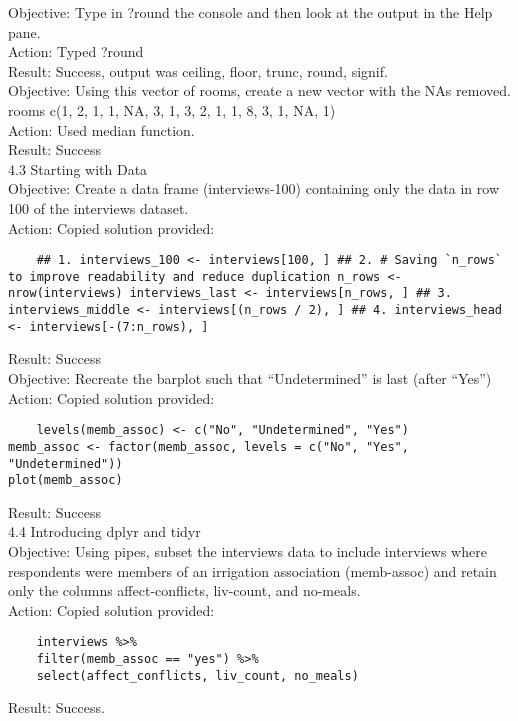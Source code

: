 \documentclass{article}
\newcommand{\chapsubhead}[1]{{\Large #1 \vspace{2ex}}}
\begin{document}
Objective: Type in ?round the console and then look at the output in the Help pane.\\
Action: Typed ?round\\
Result: Success, output was ceiling, floor, trunc, round, signif.\\

Objective: Using this vector of rooms, create a new vector with the NAs removed. rooms c(1, 2, 1, 1, NA, 3, 1, 3, 2, 1, 1, 8, 3, 1, NA, 1)\\
Action: Used median function.\\
Result: Success\\


\chapsubhead{4.3 Starting with Data}\\

Objective: Create a data frame (interviews-100) containing only the data in row 100 of the interviews dataset.\\
Action: Copied solution provided:
\begin{verbatim}
    ## 1. interviews_100 <- interviews[100, ] ## 2. # Saving `n_rows` to improve readability and reduce duplication n_rows <- nrow(interviews) interviews_last <- interviews[n_rows, ] ## 3. interviews_middle <- interviews[(n_rows / 2), ] ## 4. interviews_head <- interviews[-(7:n_rows), ]
\end{verbatim}
Result: Success\\

Objective: Recreate the barplot such that “Undetermined” is last (after “Yes”)\\
Action: Copied solution provided:
\begin{verbatim}
    levels(memb_assoc) <- c("No", "Undetermined", "Yes")
memb_assoc <- factor(memb_assoc, levels = c("No", "Yes", "Undetermined"))
plot(memb_assoc)
\end{verbatim}
Result: Success\\


\chapsubhead{4.4 Introducing dplyr and tidyr}\\

Objective: Using pipes, subset the interviews data to include interviews where respondents were members of an irrigation association (memb-assoc) and retain only the columns affect-conflicts, liv-count, and no-meals.\\
Action: Copied solution provided:
\begin{verbatim}
    interviews %>%
    filter(memb_assoc == "yes") %>%
    select(affect_conflicts, liv_count, no_meals)
\end{verbatim}
Result: Success.\\
\end{document}
